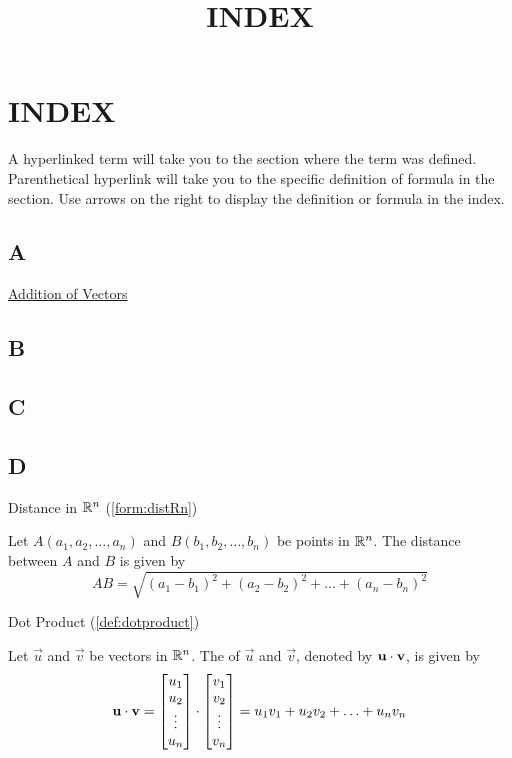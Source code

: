 \documentclass{ximera}
\title{INDEX} \license{CC BY-NC-SA 4.0}
\begin{document}
\begin{abstract}
\end{abstract}
\maketitle



\section{INDEX}
A hyperlinked term will take you to the section where the term was defined.  Parenthetical hyperlink will take you to the specific definition of formula in the section.  Use arrows on the right to display the definition or formula in the index.
\subsection{A}
\href{https://ximera.osu.edu/oerlinalg/LinearAlgebra/VEC-0030/main}{Addition of Vectors}
\subsection{B}

\subsection{C}

\subsection{D}
Distance in $\mathbb{R}^n$ (\ref{form:distRn})
\begin{expandable}
Let $A(a_1, a_2,\ldots ,a_n)$ and $B(b_1, b_2,\ldots ,b_n)$ be points in $\mathbb{R}^n$.  The distance between $A$ and $B$ is given by
$$AB=\sqrt{(a_1-b_1)^2+(a_2-b_2)^2+\ldots +(a_n-b_n)^2}$$
\end{expandable}

Dot Product (\ref{def:dotproduct})
\begin{expandable}
  Let $\vec{u}$ and $\vec{v}$ be vectors in $\mathbb{R}^n$.  The  of $\vec{u}$ and $\vec{v}$, denoted by
  $\mathbf{u}\cdot \mathbf{v}$, is given by
$$\mathbf{u}\cdot\mathbf{v}=\begin{bmatrix}u_1\\u_2\\\vdots\\u_n\end{bmatrix}\cdot\begin{bmatrix}v_1\\v_2\\\vdots\\v_n\end{bmatrix}=u_1v_1+u_2v_2+\ldots+u_nv_n$$
\end{expandable}
\end{document}
